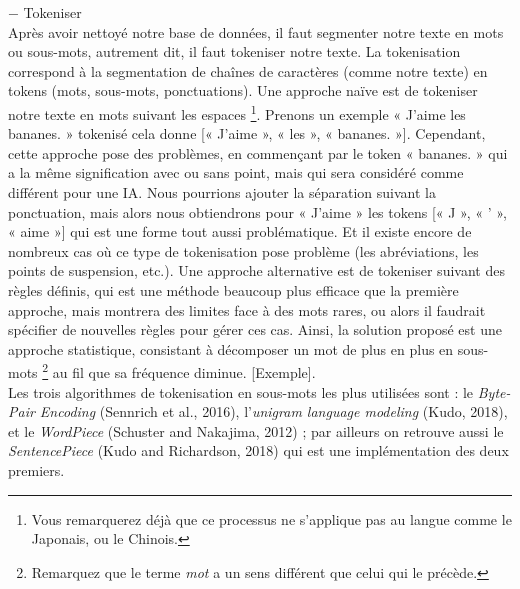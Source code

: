 \documentclass[12pt, french]{report}
\begin{document}
$-$ Tokeniser\\ %
    Après avoir nettoyé notre base de données, il faut segmenter notre texte en mots ou sous-mots, autrement dit, il faut tokeniser notre texte. La tokenisation correspond à la segmentation de  chaînes de caractères (comme notre texte) en tokens (mots, sous-mots, ponctuations).
    Une approche naïve est de tokeniser notre texte en mots suivant les espaces
    \footnote{Vous remarquerez déjà que ce processus ne s'applique pas au langue comme le Japonais, ou le Chinois.}. Prenons un exemple « J'aime les bananes. » tokenisé cela donne [« J'aime », « les », « bananes. »]. Cependant, cette approche pose des problèmes, en commençant par le token « bananes. » qui a la même signification avec ou sans point, mais qui sera considéré comme différent pour une IA. Nous pourrions ajouter la séparation 
    suivant la ponctuation, mais alors nous obtiendrons pour « J'aime » les tokens [« J », « ' », « aime »] qui est une forme tout aussi problématique. Et il existe encore de nombreux cas où ce type de tokenisation pose problème (les abréviations, les points de suspension, etc.). Une approche alternative est de tokeniser suivant des règles définis, qui est une méthode beaucoup plus efficace que la première approche, mais montrera des limites face à des mots rares, ou alors il faudrait spécifier de nouvelles règles pour gérer ces cas. Ainsi, la solution proposé est une approche statistique, consistant à décomposer un mot de plus en plus en sous-mots \footnote{Remarquez que le terme \textit{mot} a un sens différent que celui qui le précède.} au fil que sa fréquence diminue. [Exemple].\\
    Les trois algorithmes de tokenisation en sous-mots les plus utilisées sont : le \textit{Byte-Pair Encoding} (Sennrich et al., 2016), l'\textit{unigram language modeling} (Kudo, 2018), et le \textit{WordPiece} (Schuster and Nakajima, 2012) ; par ailleurs on retrouve aussi le \textit{SentencePiece} (Kudo and Richardson, 2018) qui est une implémentation des deux premiers.\\
\end{document}
